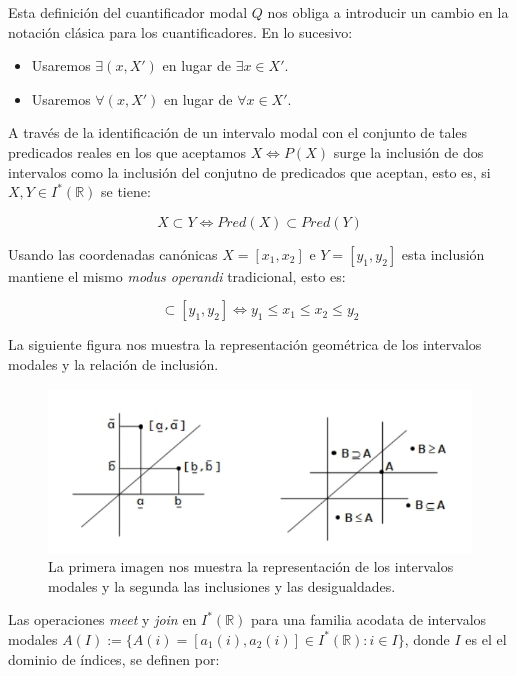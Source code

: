 Esta definición del cuantificador modal $Q$ nos obliga a introducir un cambio en la notación clásica para los cuantificadores. En lo sucesivo:

\begin{itemize}
\item Usaremos $\exists(x,X')$ en lugar de $\exists x \in X'$.
\item Usaremos $\forall(x,X')$ en lugar de $\forall x \in X'$.
\end{itemize}

A través de la identificación de un intervalo modal con el conjunto de tales predicados reales en los que aceptamos $X \iff P(X)$ surge la inclusión de dos intervalos como la inclusión del conjutno de predicados que aceptan, esto es, si $X, Y  \in I^*(\mathbb{R})$ se tiene:

\begin{equation}
X \subset Y \iff Pred(X) \subset Pred(Y)
\nonumber
\end{equation}

Usando las coordenadas canónicas $X = [x_1,x_2]$ e $Y = [y_1,y_2]$ esta inclusión mantiene el mismo{ \em modus operandi} tradicional, esto es:

\begin{equation}
[x_1,x_2] \subset [y_1,y_2] \iff y_1 \leq x_1 \leq x_2 \leq y_2
\nonumber
\end{equation}

La siguiente figura nos muestra la representación geométrica de los intervalos modales y la relación de inclusión.

\begin{figure}[h]
\centering
\includegraphics[scale=0.5]{images/florez11.png}
\caption{La primera imagen nos muestra la representación de los intervalos modales y la segunda las inclusiones y las desigualdades.}
\end{figure}

Las operaciones{ \em meet} y{ \em join} en $I^*(\mathbb{R})$ para una familia acodata de intervalos modales $A(I) := \{ A(i) = [a_1(i),a_2(i)] \in I^*(\mathbb{R}) : i \in I \}$, donde $I$ es el el dominio de índices, se definen por:

